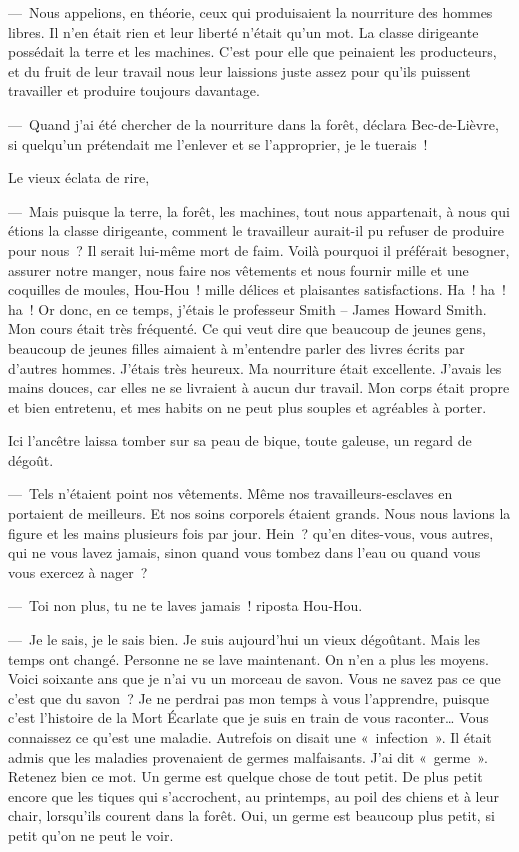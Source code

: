 \documentclass[french,twoside]{book} %
\begin{document}
— Nous appelions, en théorie, ceux qui produisaient la nourriture des hommes libres. Il n’en était rien et leur liberté n’était qu’un mot. La classe dirigeante possédait la terre et les machines. C’est pour elle que peinaient les producteurs, et du fruit de leur travail nous leur laissions juste assez pour qu’ils puissent travailler et produire toujours davantage.\par
— Quand j’ai été chercher de la nourriture dans la forêt, déclara Bec-de-Lièvre, si quelqu’un prétendait me l’enlever et se l’approprier, je le tuerais !\par
Le vieux éclata de rire,\par
— Mais puisque la terre, la forêt, les machines, tout nous appartenait, à nous qui étions la classe dirigeante, comment le travailleur aurait-il pu refuser de produire pour nous ? Il serait lui-même mort de faim. Voilà pourquoi il préférait besogner, assurer notre manger, nous faire nos vêtements et nous fournir mille et une coquilles de moules, Hou-Hou ! mille délices et plaisantes satisfactions. Ha ! ha ! ha ! Or donc, en ce temps, j’étais le professeur Smith – James Howard Smith. Mon cours était très fréquenté. Ce qui veut dire que beaucoup de jeunes gens, beaucoup de jeunes filles aimaient à m’entendre parler des livres écrits par d’autres hommes. J’étais très heureux. Ma nourriture était excellente. J’avais les mains douces, car elles ne se livraient à aucun dur travail. Mon corps était propre et bien entretenu, et mes habits on ne peut plus souples et agréables à porter.\par
Ici l’ancêtre laissa tomber sur sa peau de bique, toute galeuse, un regard de dégoût.\par
— Tels n’étaient point nos vêtements. Même nos travailleurs-esclaves en portaient de meilleurs. Et nos soins corporels étaient grands. Nous nous lavions la figure et les mains plusieurs fois par jour. Hein ? qu’en dites-vous, vous autres, qui ne vous lavez jamais, sinon quand vous tombez dans l’eau ou quand vous vous exercez à nager ?\par
— Toi non plus, tu ne te laves jamais ! riposta Hou-Hou.\par
— Je le sais, je le sais bien. Je suis aujourd’hui un vieux dégoûtant. Mais les temps ont changé. Personne ne se lave maintenant. On n’en a plus les moyens. Voici soixante ans que je n’ai vu un morceau de savon. Vous ne savez pas ce que c’est que du savon ? Je ne perdrai pas mon temps à vous l’apprendre, puisque c’est l’histoire de la Mort Écarlate que je suis en train de vous raconter… Vous connaissez ce qu’est une maladie. Autrefois on disait une « infection ». Il était admis que les maladies provenaient de germes malfaisants. J’ai dit « germe ». Retenez bien ce mot. Un germe est quelque chose de tout petit. De plus petit encore que les tiques qui s’accrochent, au printemps, au poil des chiens et à leur chair, lorsqu’ils courent dans la forêt. Oui, un germe est beaucoup plus petit, si petit qu’on ne peut le voir.\par
\end{document}
